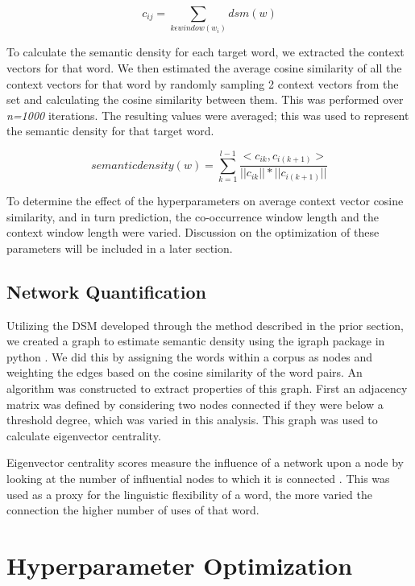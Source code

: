 \documentclass[11pt]{article}
\begin{document}
\begin{equation}
\label{eq:dsm}
c_{ij}=\sum_{k \epsilon window(w_{i})} dsm(w)
\end{equation}

To calculate the semantic density for each target word, we extracted the context vectors for that word. We then estimated the average cosine similarity of all the context vectors for that word by randomly sampling 2 context vectors from the set and calculating the cosine similarity between them. This was performed over \textit{n=1000} iterations. The resulting values were averaged; this was used to represent the semantic density for that target word.

\begin{equation}
\label{eq:semantic density}
semantic density(w) = \sum_{k=1}^{l-1} \frac{<c_{ik},c_{i(k+1)}>}{||c_{ik}||*||c_{i(k+1)}||}
\end{equation}

To determine the effect of the hyperparameters on average context vector cosine similarity, and in turn prediction, the co-occurrence window length and the context window length were varied. Discussion on the optimization of these parameters will be included in a later section.

\subsection{Network Quantification}
\label{sect:network}

Utilizing the DSM developed through the method described in the prior section, we created a graph to estimate semantic density using the igraph package in python \cite{Csardi2006}. We did this by assigning the words within a corpus as nodes and weighting the edges based on the cosine similarity of the word pairs. An algorithm was constructed to extract properties of this graph. First an adjacency matrix was defined by considering two nodes connected if they were below a threshold degree, which was varied in this analysis.  This graph was used to calculate eigenvector centrality.

Eigenvector centrality scores measure the influence of a network upon a node by looking at the number of influential nodes to which it is connected \cite{Estrada2005}. This was used as a proxy for the linguistic flexibility of a word, the more varied the connection the higher number of uses of that word.

\section{Hyperparameter Optimization}
\label{hyper}
\end{document}
